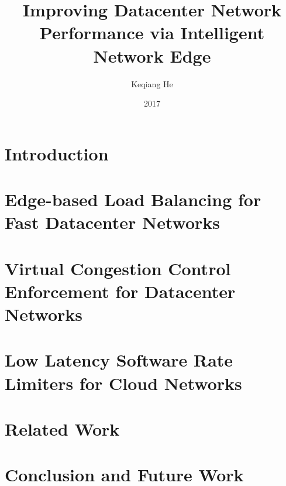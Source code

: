 \documentclass[12pt, letterpaper, oldfontcommands]{memoir}
\title{Improving Datacenter Network Performance via Intelligent Network Edge}
\author{Keqiang He}
\date{2017 \vspace{-1in}}
\begin{document}

\ifdef{\ShortenThesis}{
}{
  
}

\chapter{Introduction}
\label{thesis:chapter:intro}


\chapter{Edge-based Load Balancing for Fast Datacenter Networks}
\label{thesis:chapter:presto}


\chapter{Virtual Congestion Control Enforcement for Datacenter Networks}
\label{thesis:chapter:acdctcp}



\chapter{Low Latency Software Rate Limiters for Cloud Networks}
\label{thesis:chapter:rate_limiter}


\chapter{Related Work}
\label{thesis:chapter:related}


\chapter{Conclusion and Future Work}
\label{thesis:chapter:conclusion}






\end{document}
